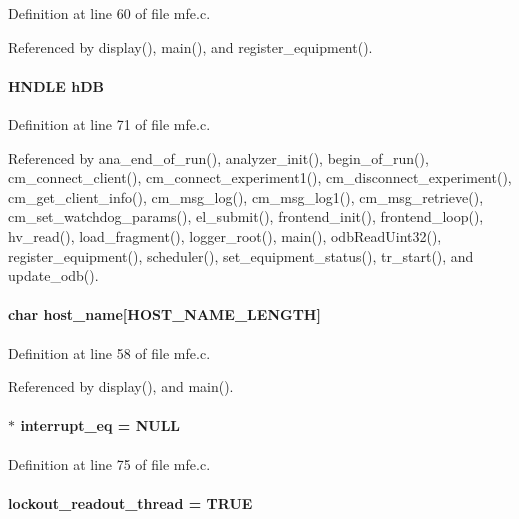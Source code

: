 Definition at line 60 of file mfe.c.

Referenced by display(), main(), and register\_\-equipment().
\paragraph[{hDB}]{\setlength{\rightskip}{0pt plus 5cm}HNDLE {\bf hDB}}\hfill\label{mfe_8c_ab1f60c53f74e806a3b9f687af38d7421}


Definition at line 71 of file mfe.c.

Referenced by ana\_\-end\_\-of\_\-run(), analyzer\_\-init(), begin\_\-of\_\-run(), cm\_\-connect\_\-client(), cm\_\-connect\_\-experiment1(), cm\_\-disconnect\_\-experiment(), cm\_\-get\_\-client\_\-info(), cm\_\-msg\_\-log(), cm\_\-msg\_\-log1(), cm\_\-msg\_\-retrieve(), cm\_\-set\_\-watchdog\_\-params(), el\_\-submit(), frontend\_\-init(), frontend\_\-loop(), hv\_\-read(), load\_\-fragment(), logger\_\-root(), main(), odbReadUint32(), register\_\-equipment(), scheduler(), set\_\-equipment\_\-status(), tr\_\-start(), and update\_\-odb().
\paragraph[{host\_\-name}]{\setlength{\rightskip}{0pt plus 5cm}char {\bf host\_\-name}\mbox{[}HOST\_\-NAME\_\-LENGTH\mbox{]}}\hfill\label{mfe_8c_af65cc3664520b7cd0817adc7106f9624}


Definition at line 58 of file mfe.c.

Referenced by display(), and main().
\paragraph[{interrupt\_\-eq}]{$\ast$ {\bf interrupt\_\-eq} = NULL}\hfill\label{mfe_8c_ae08e1d173902a2cb83c58d268c6e4d3e}


Definition at line 75 of file mfe.c.
\paragraph[{lockout\_\-readout\_\-thread}]{ {\bf lockout\_\-readout\_\-thread} = TRUE}\hfill\label{mfe_8c_ace3256e0c09b9b2d5c109f8dbab3692f}


